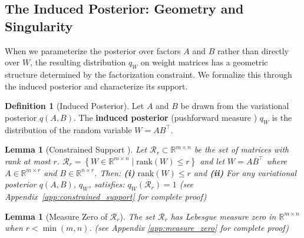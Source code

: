 \documentclass{article}
\theoremstyle{plain}
\newtheorem{lemma}[theorem]{Lemma}
\theoremstyle{definition}
\newtheorem{definition}[theorem]{Definition}
\theoremstyle{remark}
\begin{document}
\subsection{The Induced Posterior: Geometry and Singularity}
\label{sec:theory:geometry}


When we parameterize the posterior over factors $A$ and $B$ rather than directly 
over $W$, the resulting distribution $q_W$ on weight matrices has a geometric 
structure determined by the factorization constraint. We formalize this through 
the induced posterior and characterize its support.

\begin{definition}[Induced Posterior]
\label{def:induced_posterior}
Let $A$ and $B$ be drawn from the variational posterior $q(A,B)$. The 
\textbf{induced posterior} (pushforward measure \cite{bogachev2007measure}) $q_W$ is the distribution of the random variable 
$W = AB^\top$.
\end{definition}
\begin{lemma}[Constrained Support ]
\label{lem:constrained_support}
    Let $\mathcal{R}_r \subset \mathbb{R}^{m \times n}$ be the set of matrices with rank at most $r$.
$
\mathcal{R}_r = \left\{ W \in \mathbb{R}^{m \times n} \mid \text{rank}(W) \leq r \right\}
$ and
    let $W = AB^\top$ where $A \in \mathbb{R}^{m \times r}$ and $B \in \mathbb{R}^{n \times r}$. Then: \textbf{(i) }$ \text{rank}(W) \leq r$ and \textbf{(ii)} For any variational posterior $q(A, B)$, $q_W$, satisfies: $q_W(\mathcal{R}_r) = 1$ (see Appendix~\ref{app:constrained_support} for complete proof)
\end{lemma}

\begin{lemma}[Measure Zero of $\mathcal{R}_r$]
\label{lem:measure_zero}
The set $\mathcal{R}_r$ has Lebesgue measure zero in $\mathbb{R}^{m \times n}$ 
when $r < \min(m,n)$. (see Appendix \ref{app:measure_zero} for complete proof)
\end{lemma}

\end{document}
